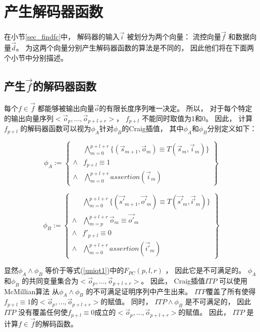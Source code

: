 \section{产生解码器函数}\label{sec_char_chap3}
在小节\ref{sec_findfc}中，
解码器的输入$\vec{i}$ 被划分为两个向量：
流控向量$\vec{f}$ 和数据向量$\vec{d}$。
为这两个向量分别产生解码器函数的算法是不同的，
因此他们将在下面两个小节中分别描述。

\subsection{产生$\vec{f}$的解码器函数}\label{subsec_fdec}

每个$f\in \vec{f}$ 都能够被输出向量$\vec{o}$的有限长度序列唯一决定。
所以，
对于每个特定的输出向量序列$<\vec{o}_p,\dots,\vec{o}_{p+l+r}>$，
$f_{p+l}$ 不能同时取值为1和0。
因此，
计算$f_{p+l}$ 的解码器函数可以视为$\phi_A$针对$\phi_B$的Craig插值，
其中$\phi_A$和$\phi_B$分别定义如下：

\begin{equation}\label{fa}
\phi_A:=
\left\{
\begin{array}{cc}
&\bigwedge_{m=0}^{p+l+r}
\{
(\vec{s}_{m+1},\vec{o}_m)\equiv T(\vec{s}_m,\vec{i}_m)
\}
\\
\wedge& f_{p+l}\equiv 1 \\
\wedge&\bigwedge_{m=0}^{p+l+r}assertion(\vec{i}_m)
\end{array}
\right\}
\end{equation}

\begin{equation}\label{fb}
\phi_B:=
\left\{
\begin{array}{cc}
&\bigwedge_{m=0}^{p+l+r}
\{
(\vec{s'}_{m+1},\vec{o'}_m)\equiv T(\vec{s'}_m,\vec{i'}_m)
\}
\\
\wedge&\bigwedge_{m=p}^{p+l+r}\vec{o}_m\equiv \vec{o'}_m \\
\wedge& f'_{p+l}\equiv 0 \\
\wedge&\bigwedge_{m=0}^{p+l+r}assertion(\vec{i'}_m)
\end{array}
\right\}
\end{equation}

显然$\phi_A\wedge \phi_B$ 等价于等式(\ref{uniqt1})中的$F_{PC}(p,l,r)$ ，
因此它是不可满足的。
$\phi_A$ 和$\phi_B$ 的共同变量集合为$<\vec{o}_p,\dots,\vec{o}_{p+l+r}>$。
因此，
Craig插值$ITP$ 可以使用McMillian算法 从$\phi_A\wedge \phi_B$ 的不可满足证明序列中产生出来。
$ITP$覆盖了所有使得$f_{p+l}\equiv 1$的$<\vec{o}_p,\dots,\vec{o}_{p+l+r}>$的赋值。
同时，
$ITP\wedge \phi_B$ 是不可满足的，
因此$ITP$ 没有覆盖任何使$f_{p+l}\equiv 0$成立的$<\vec{o}_p,\dots,\vec{o}_{p+l+r}>$的赋值。
因此，
$ITP$ 是计算$f\in\vec{f}$的解码函数。


